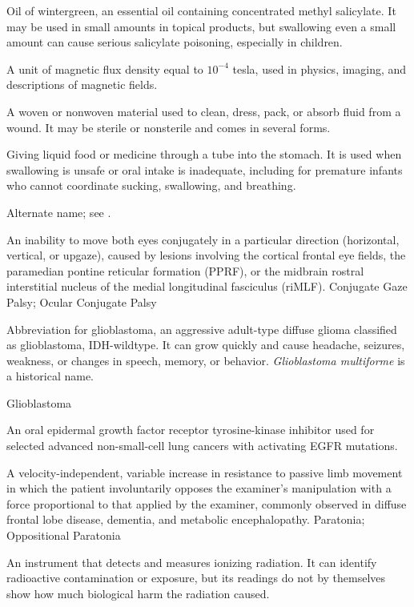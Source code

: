  Oil of wintergreen, an essential oil containing concentrated methyl salicylate. It may be used in small amounts in topical products, but swallowing even a small amount can cause serious salicylate poisoning, especially in children.

 A unit of magnetic flux density equal to $10^{-4}$ tesla, used in physics, imaging, and descriptions of magnetic fields.

 A woven or nonwoven material used to clean, dress, pack, or absorb fluid from a wound. It may be sterile or nonsterile and comes in several forms.

 Giving liquid food or medicine through a tube into the stomach. It is used when swallowing is unsafe or oral intake is inadequate, including for premature infants who cannot coordinate sucking, swallowing, and breathing.

 Alternate name; see .

 An inability to move both eyes conjugately in a particular direction (horizontal, vertical, or upgaze), caused by lesions involving the cortical frontal eye fields, the paramedian pontine reticular formation (PPRF), or the midbrain rostral interstitial nucleus of the medial longitudinal fasciculus (riMLF).
\synonyms
Conjugate Gaze Palsy; Ocular Conjugate Palsy

 Abbreviation for glioblastoma, an aggressive adult-type diffuse glioma classified as glioblastoma, IDH-wildtype. It can grow quickly and cause headache, seizures, weakness, or changes in speech, memory, or behavior. \textit{Glioblastoma multiforme} is a historical name.

\synonyms
Glioblastoma

 An oral epidermal growth factor receptor tyrosine-kinase inhibitor used for selected advanced non-small-cell lung cancers with activating EGFR mutations.

 A velocity-independent, variable increase in resistance to passive limb movement in which the patient involuntarily opposes the examiner's manipulation with a force proportional to that applied by the examiner, commonly observed in diffuse frontal lobe disease, dementia, and metabolic encephalopathy.
\synonyms
Paratonia; Oppositional Paratonia

 An instrument that detects and measures ionizing radiation. It can identify radioactive contamination or exposure, but its readings do not by themselves show how much biological harm the radiation caused.

